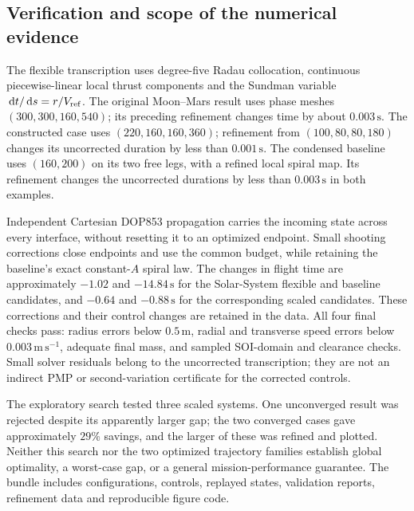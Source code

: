 \documentclass[journal, a4paper]{IEEEtran}
\newcommand{\dd}{\,\mathrm d}
\begin{document}
\subsection{Verification and scope of the numerical evidence}
The flexible transcription uses degree-five Radau collocation, continuous piecewise-linear local thrust components and the Sundman variable $\dd t/\dd s=r/V_{\rm ref}$. The original Moon--Mars result uses phase meshes $(300,300,160,540)$; its preceding refinement changes time by about $0.003\,\mathrm s$. The constructed case uses $(220,160,160,360)$; refinement from $(100,80,80,180)$ changes its uncorrected duration by less than $0.001\,\mathrm s$. The condensed baseline uses $(160,200)$ on its two free legs, with a refined local spiral map. Its refinement changes the uncorrected durations by less than $0.003\,\mathrm s$ in both examples.

Independent Cartesian DOP853 propagation carries the incoming state across every interface, without resetting it to an optimized endpoint. Small shooting corrections close endpoints and use the common budget, while retaining the baseline's exact constant-$A$ spiral law. The changes in flight time are approximately $-1.02$ and $-14.84\,\mathrm s$ for the Solar-System flexible and baseline candidates, and $-0.64$ and $-0.88\,\mathrm s$ for the corresponding scaled candidates. These corrections and their control changes are retained in the data. All four final checks pass: radius errors below $0.5\,\mathrm m$, radial and transverse speed errors below $0.003\,\mathrm{m\,s^{-1}}$, adequate final mass, and sampled SOI-domain and clearance checks. Small solver residuals belong to the uncorrected transcription; they are not an indirect PMP or second-variation certificate for the corrected controls.

The exploratory search tested three scaled systems. One unconverged result was rejected despite its apparently larger gap; the two converged cases gave approximately $29\%$ savings, and the larger of these was refined and plotted. Neither this search nor the two optimized trajectory families establish global optimality, a worst-case gap, or a general mission-performance guarantee. The bundle includes configurations, controls, replayed states, validation reports, refinement data and reproducible figure code.
\clearpage
\twocolumn
\setlength{\abovedisplayskip}{6pt plus 2pt minus 2pt}
\setlength{\belowdisplayskip}{6pt plus 2pt minus 2pt}
\setlength{\abovedisplayshortskip}{3pt plus 1pt minus 1pt}
\setlength{\belowdisplayshortskip}{6pt plus 2pt minus 2pt}
\end{document}
